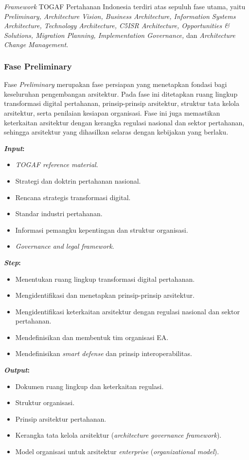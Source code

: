 \textit{Framework} TOGAF Pertahanan Indonesia terdiri atas sepuluh fase utama, yaitu \textit{Preliminary, Architecture Vision, Business Architecture, Information Systems Architecture, Technology Architecture, C5ISR Architecture, Opportunities \& Solutions, Migration Planning, Implementation Governance,} dan \textit{Architecture Change Management}.

\subsubsection{Fase Preliminary}
Fase \textit{Preliminary} merupakan fase persiapan yang menetapkan fondasi bagi keseluruhan pengembangan arsitektur.
Pada fase ini ditetapkan ruang lingkup transformasi digital pertahanan, prinsip-prinsip arsitektur, struktur tata kelola arsitektur, serta penilaian kesiapan organisasi.
Fase ini juga memastikan keterkaitan arsitektur dengan kerangka regulasi nasional dan sektor pertahanan, sehingga arsitektur yang dihasilkan selaras dengan kebijakan yang berlaku.

\textbf{\textit{Input}:}
\begin{itemize}
  \item \textit{TOGAF reference material}.
  \item Strategi dan doktrin pertahanan nasional.
  \item Rencana strategis transformasi digital.
  \item Standar industri pertahanan.
  \item Informasi pemangku kepentingan dan struktur organisasi.
  \item \textit{Governance and legal framework}.
\end{itemize}
\textbf{\textit{Step}:}
\begin{itemize}
  \item Menentukan ruang lingkup transformasi digital pertahanan.
  \item Mengidentifikasi dan menetapkan prinsip-prinsip arsitektur.
  \item Mengidentifikasi keterkaitan arsitektur dengan regulasi nasional dan sektor pertahanan.
  \item Mendefinisikan dan membentuk tim organisasi EA.
  \item Mendefinisikan \textit{smart defense} dan prinsip interoperabilitas.
\end{itemize}
\textbf{\textit{Output}:}
\begin{itemize}
  \item Dokumen ruang lingkup dan keterkaitan regulasi.
  \item Struktur organisasi.
  \item Prinsip arsitektur pertahanan.
  \item Kerangka tata kelola arsitektur (\textit{architecture governance framework}).
  \item Model organisasi untuk arsitektur \textit{enterprise} (\textit{organizational model}).
\end{itemize}

